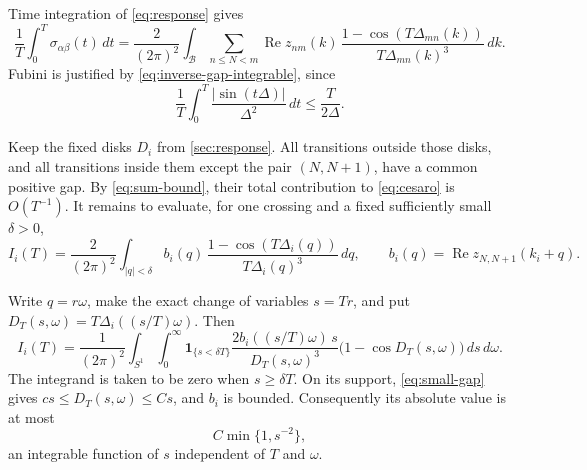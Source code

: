 \documentclass[11pt,a4paper]{article}
\newcommand{\B}{\mathcal B}
\newcommand{\one}{\mathbf 1}
\newcommand{\cB}{\frac{1}{(2\pi)^2}}
\DeclareMathOperator{\Ree}{Re}
\numberwithin{equation}{section}
\begin{document}
Time integration of \eqref{eq:response} gives
\begin{equation}\label{eq:cesaro}
 \frac1T\int_0^T\sigma_{\alpha\beta}(t)\,dt
 =\frac{2}{(2\pi)^2}\int_\B\sum_{n\leq N<m}
 \Ree z_{nm}(k)\,
 \frac{1-\cos(T\Delta_{mn}(k))}{T\Delta_{mn}(k)^3}\,dk.
\end{equation}
Fubini is justified by \eqref{eq:inverse-gap-integrable}, since
\[
 \frac1T\int_0^T\frac{|\sin(t\Delta)|}{\Delta^2}\,dt
 \leq\frac{T}{2\Delta}.
\]

Keep the fixed disks $D_i$ from \cref{sec:response}. All transitions
outside those disks, and all transitions inside them except the pair
$(N,N+1)$, have a common positive gap. By \eqref{eq:sum-bound}, their
total contribution to \eqref{eq:cesaro} is $O(T^{-1})$. It remains to
evaluate, for one crossing and a fixed sufficiently small $\delta>0$,
\begin{equation}\label{eq:cone-integral}
 I_i(T)=\frac{2}{(2\pi)^2}\int_{|q|<\delta}
 b_i(q)\,
 \frac{1-\cos(T\Delta_i(q))}{T\Delta_i(q)^3}\,dq,
 \qquad b_i(q)=\Ree z_{N,N+1}(k_i+q).
\end{equation}

Write $q=r\omega$, make the exact change of variables $s=Tr$, and put
$D_T(s,\omega)=T\Delta_i((s/T)\omega)$. Then
\begin{equation}\label{eq:scaled-integral}
 I_i(T)=\cB\int_{S^1}\int_0^\infty
 \one_{\{s<\delta T\}}
 \frac{2b_i((s/T)\omega)\,s}{D_T(s,\omega)^3}
 \bigl(1-\cos D_T(s,\omega)\bigr)\,ds\,d\omega.
\end{equation}
The integrand is taken to be zero when $s\geq\delta T$. On its support,
\eqref{eq:small-gap} gives $cs\leq D_T(s,\omega)\leq Cs$, and $b_i$ is
bounded. Consequently its absolute value is at most
\begin{equation}\label{eq:majorant}
 C\min\{1,s^{-2}\},
\end{equation}
an integrable function of $s$ independent of $T$ and $\omega$.
\end{document}
